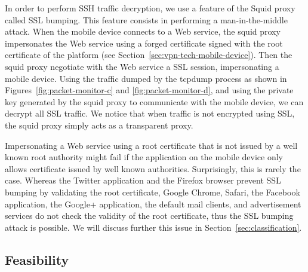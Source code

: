 In order to perform SSH traffic decryption, we use a 
feature of the Squid proxy called SSL bumping. This feature consists in performing a man-in-the-middle
attack. When the mobile device connects to a Web service, the squid
proxy impersonates the Web service using a forged certificate signed
with the root certificate of the \platname{} platform (see
Section~\ref{sec:vpn-tech-mobile-device}). Then the squid proxy
negotiate with the Web service a SSL session, impersonating a mobile
device. Using the traffic dumped by the tcpdump process as shown in
Figures~\ref{fig:packet-monitor-c} and \ref{fig:packet-monitor-d}, and
using the private key generated by the squid proxy to communicate with
the mobile device, we can decrypt all SSL traffic. We notice that when
traffic is not encrypted using SSL, the squid proxy simply acts as a
transparent proxy. 

Impersonating a Web service using a root certificate that is not
issued by a well known root authority might fail if the application on
the mobile device only allows certificate issued by well known
authorities. Surprisingly, this is rarely the case. Whereas the
Twitter application and the Firefox browser prevent SSL bumping by
validating the root certificate, Google Chrome, Safari, the Facebook
application, the Google+ application, the default mail clients, and
advertisement services do not check the validity of the root
certificate, thus the SSL bumping attack is possible. We will discuss
further this issue in Section~\ref{sec:classification}. 





\subsection{Feasibility}


